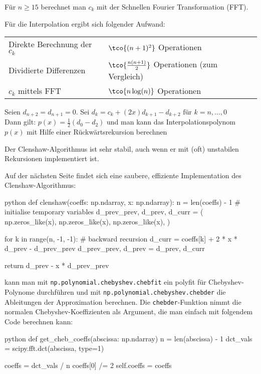 Für $n \geq 15$ berechnet man $c_k$ mit der Schnellen Fourier Transformation (FFT).

 Für die Interpolation ergibt sich folgender Aufwand:
\begin{center}
	\begin{tabular}{ll}
		Direkte Berechnung der $c_k$ & $\tco{(n + 1)^2}$ Operationen                           \\
		Dividierte Differenzen       & $\tco{\frac{n (n + 1)}{2}}$ Operationen (zum Vergleich) \\
		$c_k$ mittels FFT            & $\tco{n \log(n)}$ Operationen
	\end{tabular}
\end{center}


 Seien $d_{n + 2} = d_{n + 1} = 0$. Sei $d_k = c_k + (2x)d_{k + 1} - d_{k + 2} \text{ für } k = n, \ldots, 0$\\
Dann gilt: $p(x) = \frac{1}{2}(d_0 - d_2)$ und man kann das Interpolationspolynom $p(x)$ mit Hilfe einer Rückwärtsrekursion berechnen

Der Clenshaw-Algorithmus ist sehr stabil, auch wenn er mit (oft) unstabilen Rekursionen implementiert ist.

Auf der nächsten Seite findet sich eine saubere, effiziente Implementation des Clenshaw-Algorithmus:

\newpage
\begin{code}{python}
    def clenshaw(coeffs: np.ndarray, x: np.ndarray):
        n = len(coeffs) - 1
        # initialise temporary variables
        d_prev_prev, d_prev, d_curr = (
            np.zeros_like(x),
            np.zeros_like(x),
            np.zeros_like(x),
        )

        for k in range(n, -1, -1):  # backward recursion
            d_curr = coeffs[k] + 2 * x * d_prev - d_prev_prev
            d_prev_prev, d_prev = d_prev, d_curr

        return d_prev - x * d_prev_prev
\end{code}


\innumpy kann man mit \texttt{np.polynomial.chebyshev.chebfit} ein polyfit für Chebyshev-Polynome durchführen und mit \texttt{np.polynomial.chebyshev.chebder}
die Ableitungen der Approximation berechnen. Die \texttt{chebder}-Funktion nimmt die normalen Chebyshev-Koeffizienten als Argument, die man einfach mit folgendem Code berechnen kann:
\begin{code}{python}
    def get_cheb_coeffs(abscissa: np.ndarray)
        n = len(abscissa) - 1
        dct_vals = scipy.fft.dct(abscissa, type=1)

        coeffs = dct_vals / n
        coeffs[0] /= 2
        self.coeffs = coeffs
\end{code}
